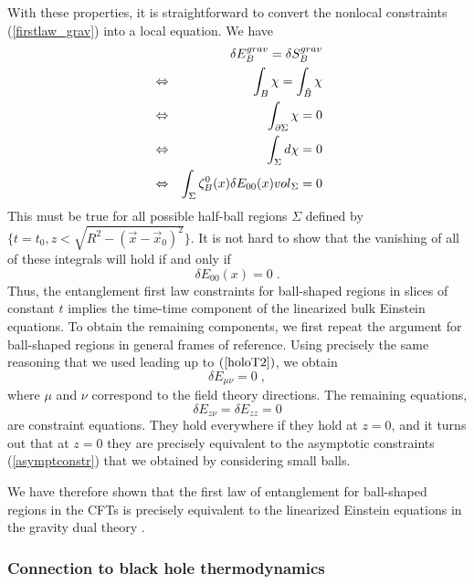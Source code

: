 \documentclass[12pt,epsf]{article}
\newcommand{\be}{\begin{equation}}
\newcommand{\ee}{\end{equation}}
\newcommand{\bea}{\begin{eqnarray}}
\newcommand{\eea}{\end{eqnarray}}
\begin{document}
With these properties, it is straightforward to convert the nonlocal constraints (\ref{firstlaw_grav}) into a local equation. We have
\bea
&& \delta E^{grav}_B = \delta S^{grav}_B \cr
&\Leftrightarrow& \int_B \chi = \int_{\tilde{B}} \chi \cr
&\Leftrightarrow& \int_{\partial \Sigma} \chi = 0 \cr
&\Leftrightarrow& \int_\Sigma d \chi = 0 \cr
&\Leftrightarrow& \int_\Sigma \zeta_B^0(x) \delta E_{00}(x) {vol}_\Sigma = 0
\eea
This must be true for all possible half-ball regions $\Sigma$ defined by $\{t = t_0, z < \sqrt{R^2 - (\vec{x} - \vec{x}_0)^2}\}$. It is not hard to show \cite{faulkner2014gravitation} that the vanishing of all of these integrals will hold if and only if
\be
\delta E_{00}(x) = 0 \; .
\ee
Thus, the entanglement first law constraints for ball-shaped regions in slices of constant $t$ implies the time-time component of the linearized bulk Einstein equations. To obtain the remaining components, we first repeat the argument for ball-shaped regions in general frames of reference. Using precisely the same reasoning that we used leading up to $(\ref{holoT2})$, we obtain
\be
\delta E_{\mu \nu} = 0 \; ,
\ee
where $\mu$ and $\nu$ correspond to the field theory directions. The remaining equations,
\be
\delta E_{z \nu} = \delta E_{z z} = 0
\ee
are constraint equations. They hold everywhere if they hold at $z=0$, and it turns out that at $z=0$ they are precisely equivalent to the asymptotic constraints (\ref{asymptconstr}) that we obtained by considering small balls.

We have therefore shown that the first law of entanglement for ball-shaped regions in the CFTs is precisely equivalent to the linearized Einstein equations in the gravity dual theory \cite{Lashkari:2013koa,faulkner2014gravitation}.

\subsubsection*{Connection to black hole thermodynamics}
\end{document}
